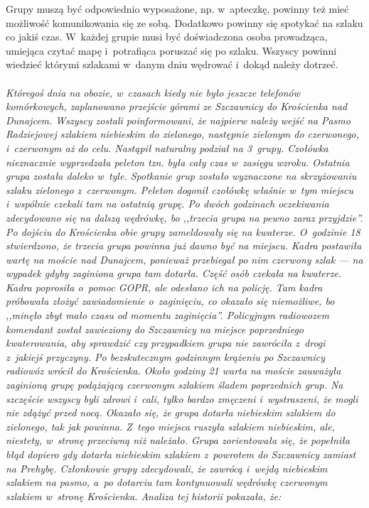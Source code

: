 \documentclass[a5paper,10pt,titlepage,twoside]{article}
\begin{document}
Grupy muszą być odpowiednio wyposażone, np. w~apteczkę, powinny też mieć możliwość komunikowania się ze sobą. Dodatkowo powinny się spotykać na szlaku co jakiś czas. W~każdej grupie musi być doświadczona osoba prowadząca, umiejąca czytać mapę i~potrafiąca poruszać się po szlaku. Wszyscy powinni wiedzieć którymi szlakami w~danym dniu wędrować i~dokąd należy dotrzeć.
\\
\\
\small{
\emph{\label{akcja-kroscienko-szczawnica}Któregoś dnia na obozie, w~czasach kiedy nie było jeszcze telefonów komórkowych, zaplanowano przejście górami ze Szczawnicy do Krościenka nad Dunajcem. Wszyscy zostali poinformowani, że najpierw należy wejść na Pasmo Radziejowej szlakiem niebieskim do zielonego, następnie zielonym do czerwonego, i~czerwonym aż do celu. Nastąpił naturalny podział na 3~grupy. Czołówka nieznacznie wyprzedzała peleton tzn. była cały czas w~zasięgu wzroku. Ostatnia grupa została daleko w~tyle. Spotkanie grup zostało wyznaczone na skrzyżowaniu szlaku zielonego z~czerwonym. Peleton dogonił czołówkę właśnie w~tym miejscu i~wspólnie czekali tam na ostatnią grupę. Po dwóch godzinach oczekiwania zdecydowano się na dalszą wędrówkę, bo ,,trzecia grupa na pewno zaraz przyjdzie''. Po dojściu do Krościenka obie grupy zameldowały się na kwaterze. O~godzinie 18 stwierdzono, że trzecia grupa powinna już dawno być na miejscu. Kadra postawiła wartę na moście nad Dunajcem, ponieważ przebiegał po nim czerwony szlak --- na wypadek gdyby zaginiona grupa tam dotarła. Część osób czekała na kwaterze. Kadra poprosiła o~pomoc GOPR, ale odesłano ich na policję. Tam kadra próbowała złożyć zawiadomienie o~zaginięciu, co okazało się niemożliwe, bo ,,minęło zbyt mało czasu od momentu zaginięcia''. Policyjnym radiowozem komendant został zawieziony do Szczawnicy na miejsce poprzedniego kwaterowania, aby sprawdzić czy przypadkiem grupa nie zawróciła z~drogi z~jakiejś przyczyny. Po bezskutecznym godzinnym krążeniu po Szczawnicy radiowóz wrócił do Krościenka. Około godziny 21 warta na moście zauważyła zaginioną grupę podążającą czerwonym szlakiem śladem poprzednich grup. Na szczęście wszyscy byli zdrowi i~cali, tylko bardzo zmęczeni i~wystraszeni, że mogli nie zdążyć przed nocą. Okazało się, że grupa dotarła niebieskim szlakiem do zielonego, tak jak powinna. Z~tego miejsca ruszyła szlakiem niebieskim, ale, niestety, w~stronę przeciwną niż należało. Grupa zorientowała się, że popełniła błąd dopiero gdy dotarła niebieskim szlakiem z~powrotem do Szczawnicy zamiast na Prehybę. Członkowie grupy zdecydowali, że zawrócą i~wejdą niebieskim szlakiem na pasmo, a~po dotarciu tam kontynuowali wędrówkę czerwonym szlakiem w~stronę Krościenka. Analiza tej historii pokazała, że:
}}
\end{document}
